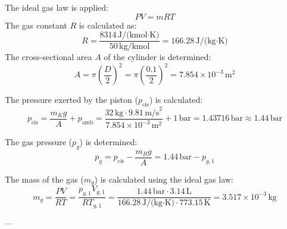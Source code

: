 The ideal gas law is applied:  
\[
PV = mRT
\]  
The gas constant \( R \) is calculated as:  
\[
R = \frac{8314 \, \text{J/(kmol·K)}}{50 \, \text{kg/kmol}} = 166.28 \, \text{J/(kg·K)}
\]  
The cross-sectional area \( A \) of the cylinder is determined:  
\[
A = \pi \left(\frac{D}{2}\right)^2 = \pi \left(\frac{0.1}{2}\right)^2 = 7.854 \times 10^{-3} \, \text{m}^2
\]  

The pressure exerted by the piston (\( p_{\text{cis}} \)) is calculated:  
\[
p_{\text{cis}} = \frac{m_K g}{A} + p_{\text{amb}} = \frac{32 \, \text{kg} \cdot 9.81 \, \text{m/s}^2}{7.854 \times 10^{-3} \, \text{m}^2} + 1 \, \text{bar} = 1.43716 \, \text{bar} \approx 1.44 \, \text{bar}
\]  

The gas pressure (\( p_g \)) is determined:  
\[
p_g = p_{\text{cis}} - \frac{m_B g}{A} = 1.44 \, \text{bar} - p_{g,1}
\]  

The mass of the gas (\( m_g \)) is calculated using the ideal gas law:  
\[
m_g = \frac{PV}{RT} = \frac{p_{g,1} V_{g,1}}{R T_{g,1}} = \frac{1.44 \, \text{bar} \cdot 3.14 \, \text{L}}{166.28 \, \text{J/(kg·K)} \cdot 773.15 \, \text{K}} = 3.517 \times 10^{-3} \, \text{kg}
\]  

---